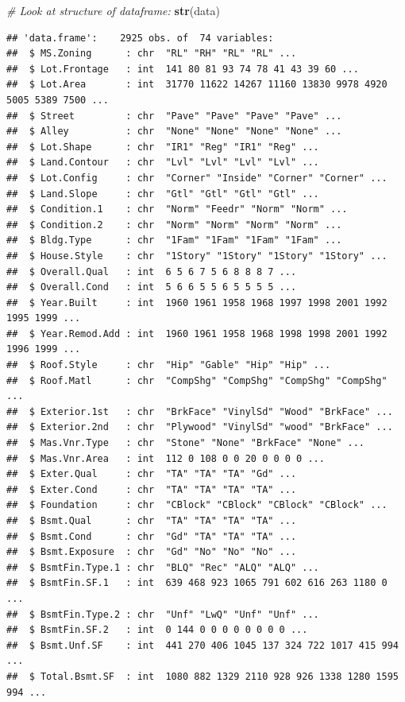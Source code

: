 \documentclass[
]{article}
\newenvironment{Shaded}{\begin{snugshade}}{\end{snugshade}}
\newcommand{\CommentTok}[1]{\textcolor[rgb]{0.56,0.35,0.01}{\textit{#1}}}
\newcommand{\KeywordTok}[1]{\textcolor[rgb]{0.13,0.29,0.53}{\textbf{#1}}}
\newcommand{\NormalTok}[1]{#1}
\begin{document}
\begin{Shaded}
\begin{Highlighting}[]
\CommentTok{# Look at structure of dataframe:}
\KeywordTok{str}\NormalTok{(data)}
\end{Highlighting}
\end{Shaded}

\begin{verbatim}
## 'data.frame':    2925 obs. of  74 variables:
##  $ MS.Zoning      : chr  "RL" "RH" "RL" "RL" ...
##  $ Lot.Frontage   : int  141 80 81 93 74 78 41 43 39 60 ...
##  $ Lot.Area       : int  31770 11622 14267 11160 13830 9978 4920 5005 5389 7500 ...
##  $ Street         : chr  "Pave" "Pave" "Pave" "Pave" ...
##  $ Alley          : chr  "None" "None" "None" "None" ...
##  $ Lot.Shape      : chr  "IR1" "Reg" "IR1" "Reg" ...
##  $ Land.Contour   : chr  "Lvl" "Lvl" "Lvl" "Lvl" ...
##  $ Lot.Config     : chr  "Corner" "Inside" "Corner" "Corner" ...
##  $ Land.Slope     : chr  "Gtl" "Gtl" "Gtl" "Gtl" ...
##  $ Condition.1    : chr  "Norm" "Feedr" "Norm" "Norm" ...
##  $ Condition.2    : chr  "Norm" "Norm" "Norm" "Norm" ...
##  $ Bldg.Type      : chr  "1Fam" "1Fam" "1Fam" "1Fam" ...
##  $ House.Style    : chr  "1Story" "1Story" "1Story" "1Story" ...
##  $ Overall.Qual   : int  6 5 6 7 5 6 8 8 8 7 ...
##  $ Overall.Cond   : int  5 6 6 5 5 6 5 5 5 5 ...
##  $ Year.Built     : int  1960 1961 1958 1968 1997 1998 2001 1992 1995 1999 ...
##  $ Year.Remod.Add : int  1960 1961 1958 1968 1998 1998 2001 1992 1996 1999 ...
##  $ Roof.Style     : chr  "Hip" "Gable" "Hip" "Hip" ...
##  $ Roof.Matl      : chr  "CompShg" "CompShg" "CompShg" "CompShg" ...
##  $ Exterior.1st   : chr  "BrkFace" "VinylSd" "Wood" "BrkFace" ...
##  $ Exterior.2nd   : chr  "Plywood" "VinylSd" "wood" "BrkFace" ...
##  $ Mas.Vnr.Type   : chr  "Stone" "None" "BrkFace" "None" ...
##  $ Mas.Vnr.Area   : int  112 0 108 0 0 20 0 0 0 0 ...
##  $ Exter.Qual     : chr  "TA" "TA" "TA" "Gd" ...
##  $ Exter.Cond     : chr  "TA" "TA" "TA" "TA" ...
##  $ Foundation     : chr  "CBlock" "CBlock" "CBlock" "CBlock" ...
##  $ Bsmt.Qual      : chr  "TA" "TA" "TA" "TA" ...
##  $ Bsmt.Cond      : chr  "Gd" "TA" "TA" "TA" ...
##  $ Bsmt.Exposure  : chr  "Gd" "No" "No" "No" ...
##  $ BsmtFin.Type.1 : chr  "BLQ" "Rec" "ALQ" "ALQ" ...
##  $ BsmtFin.SF.1   : int  639 468 923 1065 791 602 616 263 1180 0 ...
##  $ BsmtFin.Type.2 : chr  "Unf" "LwQ" "Unf" "Unf" ...
##  $ BsmtFin.SF.2   : int  0 144 0 0 0 0 0 0 0 0 ...
##  $ Bsmt.Unf.SF    : int  441 270 406 1045 137 324 722 1017 415 994 ...
##  $ Total.Bsmt.SF  : int  1080 882 1329 2110 928 926 1338 1280 1595 994 ...

\end{verbatim}
\end{document}
